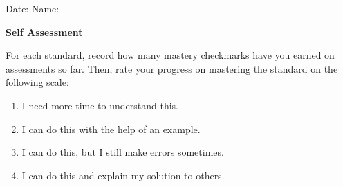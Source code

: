 \documentclass[letterpaper]{article}
\begin{document}
 Date: \underline{\phantom{xxxxxxxxxxxxxxxxx}} \hfill
  Name: \underline{\phantom{xxxxxxxxxxxxxxxxxxxxxxxxxxxxxxxxxxxx}}\\

\begin{center}
{\Large \bf Self Assessment} \\
\end{center}
	

For each standard, record how many mastery checkmarks have you earned on assessments so far.  Then, rate your progress on mastering the standard on the following scale:
\begin{multicols}{2}
\begin{enumerate}[1.]
\item I need more time to understand this.
\item I can do this with the help of an example.
\item I can do this, but I still make errors sometimes.
\item I can do this and explain my solution to others.
\end{enumerate}
\end{multicols}


\setlength{\extrarowheight}{9pt}
\end{document}
